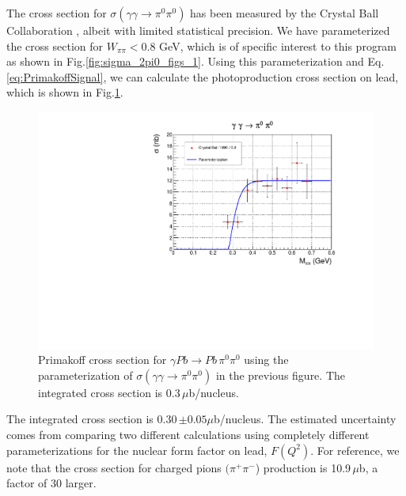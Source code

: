 The cross section for $\sigma(\gamma\gamma\rightarrow\pi^0\pi^0)$ has
been measured by the Crystal Ball Collaboration
\cite{Marsiske:1990hx}, albeit with limited statistical precision. We
have parameterized the cross section for $W_{\pi\pi}<0.8$ GeV, which
is of specific interest to this program as shown in
Fig.\ref{fig:sigma_2pi0_figs_1}. Using this parameterization and
Eq.\ref{eq:PrimakoffSignal}, we can calculate the photoproduction
cross section on lead, which is shown in
Fig.\ref{fig:sigma_2pi0_figs_2}.
\begin{figure}[tph]
\centering
\includegraphics[page=2,width=4.75in]{figures/sigma_2pi0_figs.pdf}
\caption{Primakoff cross section for $\gamma Pb \rightarrow Pb\, \pi^0 \pi^0$ using the parameterization of  $\sigma(\gamma\gamma\rightarrow \pi^0\pi^0)$ in the previous figure. The integrated cross section is 0.3\,$\mu$b/nucleus.
\label{fig:sigma_2pi0_figs_2}}
\end{figure}
The integrated cross section is 0.30\,$\pm0.05\mu$b/nucleus. The estimated uncertainty comes from comparing two different calculations using completely different parameterizations for the nuclear form factor on lead, $F(Q^2)$. For reference,
we note that the cross section for charged pions $(\pi^+\pi^-$)
production is 10.9\,$\mu$b, a factor of 30 larger.

